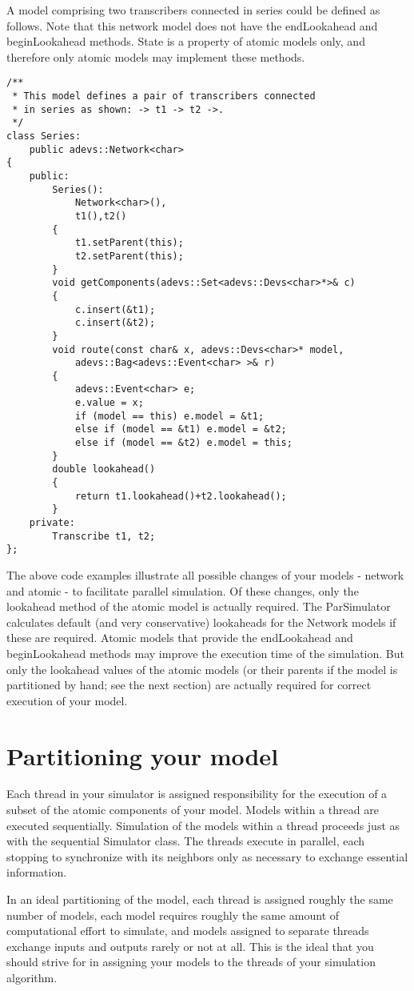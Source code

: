 A model comprising two transcribers connected in series could be defined as follows. Note that this network model does not have the endLookahead and beginLookahead methods. State is a property of atomic models only, and therefore only atomic models may implement these methods.
\begin{verbatim}
/**
 * This model defines a pair of transcribers connected
 * in series as shown: -> t1 -> t2 ->.
 */
class Series:
	public adevs::Network<char>
{
	public:
		Series():
			Network<char>(),
			t1(),t2()
		{
			t1.setParent(this);
			t2.setParent(this);
		}
		void getComponents(adevs::Set<adevs::Devs<char>*>& c)
		{
			c.insert(&t1);
			c.insert(&t2);
		}
		void route(const char& x, adevs::Devs<char>* model,
			adevs::Bag<adevs::Event<char> >& r)
		{
			adevs::Event<char> e;
			e.value = x;
			if (model == this) e.model = &t1;
			else if (model == &t1) e.model = &t2;
			else if (model == &t2) e.model = this;
		}
		double lookahead()
		{
			return t1.lookahead()+t2.lookahead();
		}
	private:
		Transcribe t1, t2;
};
\end{verbatim}

The above code examples illustrate all possible changes of your models - network and atomic - to facilitate parallel simulation. Of these changes, only the lookahead method of the atomic model is actually required. The ParSimulator calculates default (and very conservative) lookaheads for the Network models if these are required. Atomic models that provide the endLookahead and beginLookahead methods may improve the execution time of the simulation. But only the lookahead values of the atomic models (or their parents if the model is partitioned by hand; see the next section) are actually required for correct execution of your model.

\section{Partitioning your model}
Each thread in your simulator is assigned responsibility for the execution of a subset of the atomic components of your model. Models within a thread are executed sequentially. Simulation of the models within a thread proceeds just as with the sequential Simulator class. The threads execute in parallel, each stopping to synchronize with its neighbors only as necessary to exchange essential information.

In an ideal partitioning of the model, each thread is assigned roughly the same number of models, each model requires roughly the same amount of computational effort to simulate, and models assigned to separate threads exchange inputs and outputs rarely or not at all. This is the ideal that you should strive for in assigning your models to the threads of your simulation algorithm.

